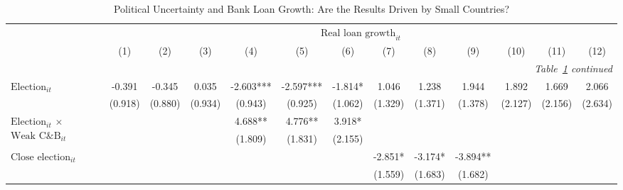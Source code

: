 \begin{longtable}{m{4cm}*{12}{c}}                                         \caption{Political Uncertainty and Bank Loan Growth: Are the Results Driven by Small Countries?\label{robustnosmallloan1}}\\                                         \toprule                                         &\multicolumn{12}{c}{$\text{Real loan growth}_{it}$} \\ \cmidrule(lr){2-13}
                    &         (1)   &         (2)   &         (3)   &         (4)   &         (5)   &         (6)   &         (7)   &         (8)   &         (9)   &        (10)   &        (11)   &        (12)   \\
\midrule\endfirsthead                                         \multicolumn{13}{r}{\textit{Table~\ref{robustnosmallloan1} continued}} \\                                         \toprule\endhead\midrule\endfoot\endlastfoot
$\text{Election}_{it}$&      -0.391   &      -0.345   &       0.035   &      -2.603***&      -2.597***&      -1.814*  &       1.046   &       1.238   &       1.944   &       1.892   &       1.669   &       2.066   \\
                    &     (0.918)   &     (0.880)   &     (0.934)   &     (0.943)   &     (0.925)   &     (1.062)   &     (1.329)   &     (1.371)   &     (1.378)   &     (2.127)   &     (2.156)   &     (2.634)   \\
\multirow{2}{4cm}{$\text{Election}_{it}$ $\times$ $\text{Weak C\&B}_{it}$}&               &               &               &       4.688** &       4.776** &       3.918*  &               &               &               &               &               &               \\
                    &               &               &               &     (1.809)   &     (1.831)   &     (2.155)   &               &               &               &               &               &               \\
\multirow{2}{4cm}{$\text{Close election}_{it}$}&               &               &               &               &               &               &      -2.851*  &      -3.174*  &      -3.894** &               &               &               \\
                    &               &               &               &               &               &               &     (1.559)   &     (1.683)   &     (1.682)   &               &               &               \\

\end{longtable}
